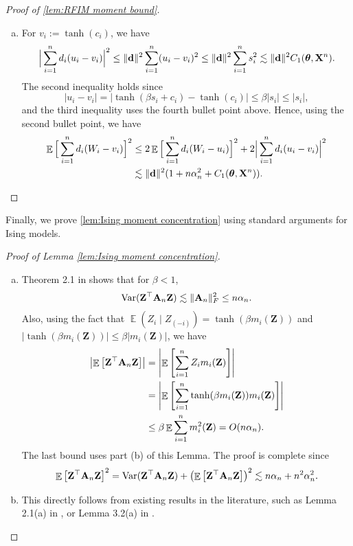 \documentclass[preprint,reqno]{imsart}
\newcommand{\ttheta}{\boldsymbol{\theta}}
\newcommand{\an}{\alpha_{\mathnormal n}}
\DeclareMathOperator{\EE}{\mathbb{E}}
\DeclareMathOperator{\Var}{Var}
\newcommand{\A}{\mathbf{A}}
\newcommand{\Z}{\mathbf{Z}}
\newcommand{\X}{\mathbf{X}}
\DeclareMathOperator{\sumin}{\sum_{\mathnormal i=1}^{\mathnormal n}}
\begin{document}
\begin{appendix}
\begin{proof}[Proof of \cref{lem:RFIM moment bound}]
\begin{enumerate}[(a)]
    
    \item For $v_i := \tanh(c_i)$, we have
    $$\Big|\sumin d_i(u_i - v_i)\Big|^2 \le \lVert \mathbf{d} \rVert^2 \sumin (u_i - v_i)^2 \le \lVert \mathbf{d} \rVert^2 \sumin s_i^2 \lesssim \lVert \mathbf{d} \rVert^2 C_1(\ttheta, \X^n).$$
    The second inequality holds since
    $$|u_i - v_i| = |\tanh(\beta s_i + c_i) - \tanh(c_i)| \le \beta |s_i| \le |s_i|,$$
    and the third inequality uses the fourth bullet point above.
    Hence, using the second bullet point, we have
    \begin{align*}
        \EE \Big[\sumin d_i(W_i- v_i )\Big]^2 &\le 2\EE \Big[\sumin d_i(W_i- u_i )\Big]^2 + 2\Big|\sumin d_i(u_i - v_i)\Big|^2 \\
        &\lesssim \lVert \mathbf{d} \rVert^2 (1 + n \an^2 + C_1(\ttheta, \X^n)).
    \end{align*}
\end{enumerate}
\end{proof}


Finally, we prove \cref{lem:Ising moment concentration} using standard arguments for Ising models.

\begin{proof}[Proof of Lemma \ref{lem:Ising moment concentration}]
\begin{enumerate}[(a)]
    \item Theorem 2.1 in \cite{gheissari2018concentration} shows that for $\beta < 1$, 
    $$\Var(\Z^\top \A_n \Z) \lesssim \|\A_n\|_F^2 \le n \an.$$
    Also, using the fact that $\EE(Z_i \mid Z_{(-i)}) = \tanh(\beta m_i(\Z))$ and $|\tanh(\beta m_i(\Z))| \le \beta |m_i(\Z)|$, we have
    \begin{align*}
        \left|\EE \left[\Z^\top \A_n \Z\right]\right| &= \left|\EE \left[ \sumin Z_i m_i(\Z) \right]\right| \\
        &= \left|\EE \left[\sumin \tanh(\beta m_i(\Z)) m_i(\Z) \right]\right| \\
        &\le \beta \EE \sumin m_i^2 (\Z) = O(n \an).%
    \end{align*}
    The last bound uses part (b) of this Lemma. The proof is complete since
    $$\EE \left[ \Z^\top \A_n \Z\right]^2 = \Var(\Z^\top \A_n \Z) + \left(\EE \left[\Z^\top \A_n \Z \right]\right)^2 \lesssim n\an + n^2 \alpha_n^2.$$
    
    \item This directly follows from existing results in the literature, such as Lemma 2.1(a) in \cite{deb2023fluctuations}, or Lemma 3.2(a) in \cite{lee2024rfim}.
\end{enumerate}
\end{proof}



\end{appendix}
\end{document}
